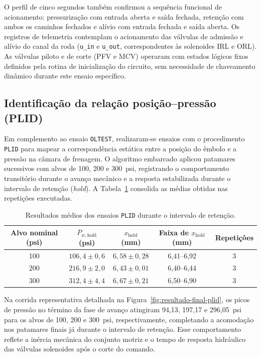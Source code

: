 O perfil de cinco segundos também confirmou a sequência funcional de acionamento: pressurização com entrada aberta e saída fechada, retenção com ambos os caminhos fechados e alívio com entrada fechada e saída aberta. Os registros de telemetria contemplam o acionamento das válvulas de admissão e alívio do canal da roda (\texttt{u\_in} e \texttt{u\_out}, correspondentes às solenoides IRL e ORL). As válvulas piloto e de corte (PFV e MCV) operaram com estados lógicos fixos definidos pela rotina de inicialização do circuito, sem necessidade de chaveamento dinâmico durante este ensaio específico.

\subsection{Identificação da relação posição--pressão (PLID)}
\label{sec:resultado-final-plid}

Em complemento ao ensaio \texttt{OLTEST}, realizaram-se ensaios com o procedimento \texttt{PLID} para mapear a correspondência estática entre a posição do êmbolo e a pressão na câmara de frenagem. O algoritmo embarcado aplicou patamares sucessivos com alvos de 100, 200 e 300~psi, registrando o comportamento transitório durante o avanço mecânico e a resposta estabilizada durante o intervalo de retenção (\textit{hold}). A Tabela~\ref{tab:resultado-final-plid} consolida as médias obtidas nas repetições executadas.

\begin{table}[htbp]
    \centering
    \caption{Resultados médios dos ensaios \texttt{PLID} durante o intervalo de retenção.}
    \label{tab:resultado-final-plid}
    \begin{tabular}{c c c c c}
        \toprule
        Alvo nominal (psi) & $P_{w,\mathrm{hold}}$ (psi) & $x_{\mathrm{hold}}$ (mm) & Faixa de $x_{\mathrm{hold}}$ (mm) & Repetições \\
        \midrule
        100 & $106{,}4 \pm 0{,}6$ & $6{,}58 \pm 0{,}28$ & 6,41--6,92 & 3 \\
        200 & $216{,}9 \pm 2{,}0$ & $6{,}43 \pm 0{,}01$ & 6,40--6,44 & 3 \\
        300 & $312{,}4 \pm 4{,}4$ & $6{,}67 \pm 0{,}21$ & 6,50--6,90 & 3 \\
        \bottomrule
    \end{tabular}
\end{table}

Na corrida representativa detalhada na Figura~\ref{fig:resultado-final-plid}, os picos de pressão no término da fase de avanço atingiram 94,13, 197,17 e 296,05~psi para os alvos de 100, 200 e 300~psi, respectivamente, completando a acomodação nos patamares finais já durante o intervalo de retenção. Esse comportamento reflete a inércia mecânica do conjunto motriz e o tempo de resposta hidráulico das válvulas solenoides após o corte do comando.


